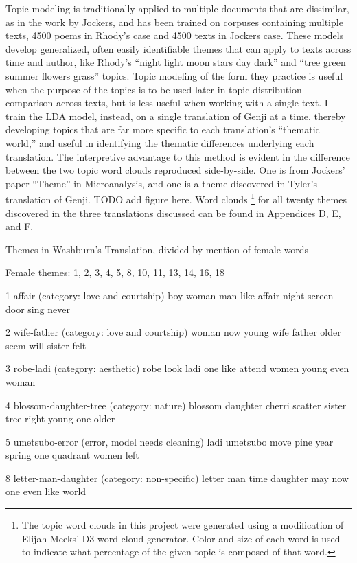 \documentclass[12pt]{article}
\begin{document}
\begin{flushleft}
\begin{spacing}{2.0}
Topic modeling is traditionally applied to multiple documents that are dissimilar, as in the work by Jockers, and has been trained on corpuses containing multiple texts, 4500 poems in Rhody’s case and 4500 texts in Jockers case. These models develop generalized, often easily identifiable themes that can apply to texts across time and author, like Rhody’s ``night light moon stars day dark'' and ``tree green summer flowers grass'' topics. Topic modeling of the form they practice is useful when the purpose of the topics is to be used later in topic distribution comparison across texts, but is less useful when working with a single text. I train the LDA model, instead, on a single translation of Genji at a time, thereby developing topics that are far more specific to each translation’s ``thematic world,'' and useful in identifying the thematic differences underlying each translation. The interpretive advantage to this method is evident in the difference between the two topic word clouds reproduced side-by-side. One is from Jockers’ paper ``Theme'' in Microanalysis, and one is a theme discovered in Tyler’s translation of Genji. TODO add figure here. Word clouds \footnote{The topic word clouds in this project were generated using a modification of Elijah Meeks’ D3 word-cloud generator. Color and size of each word is used to indicate what percentage of the given topic is composed of that word.} for all twenty themes discovered in the three translations discussed can be found in Appendices D, E, and F.

Themes in Washburn’s Translation, divided by mention of female words

Female themes:
1, 2, 3, 4, 5, 8, 10, 11, 13, 14, 16, 18

1 affair (category: love and courtship)
boy woman man like affair night screen door sing never

2 wife-father (category: love and courtship)
woman now young wife father older seem will sister felt

3 robe-ladi (category: aesthetic)
robe look ladi one like attend women young even woman

4 blossom-daughter-tree (category: nature)
blossom daughter cherri scatter sister tree right young one older

5 umetsubo-error (error, model needs cleaning)
ladi umetsubo move pine year spring one quadrant women left

8 letter-man-daughter (category: non-specific)
letter man time daughter may now one even like world


\end{spacing}
\end{flushleft}
\end{document}

